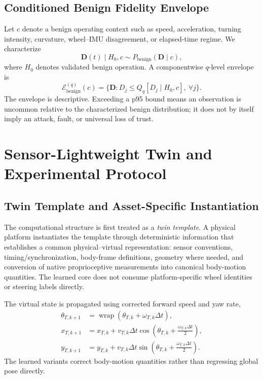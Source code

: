 \documentclass[journal]{IEEEtran}
\begin{document}
\subsection{Conditioned Benign Fidelity Envelope}
Let $c$ denote a benign operating context such as speed, acceleration, turning intensity, curvature, wheel--IMU disagreement, or elapsed-time regime. We characterize
\begin{equation}
\mathbf{D}(t)\mid H_0,c\sim P_{\mathrm{benign}}(\mathbf{D}\mid c),
\end{equation}
where $H_0$ denotes validated benign operation. A componentwise $q$-level envelope is
\begin{equation}
\mathcal{E}^{(q)}_{\mathrm{benign}}(c)=\{\mathbf{D}:D_j\le Q_q[D_j\mid H_0,c],\ \forall j\}.
\end{equation}
The envelope is descriptive. Exceeding a p95 bound means an observation is uncommon relative to the characterized benign distribution; it does not by itself imply an attack, fault, or universal loss of trust.

\section{Sensor-Lightweight Twin and Experimental Protocol}
\subsection{Twin Template and Asset-Specific Instantiation}
The computational structure is first treated as a \emph{twin template}. A physical platform instantiates the template through deterministic information that establishes a common physical--virtual representation: sensor conventions, timing/synchronization, body-frame definitions, geometry where needed, and conversion of native proprioceptive measurements into canonical body-motion quantities. The learned core does not consume platform-specific wheel identities or steering labels directly.

The virtual state is propagated using corrected forward speed and yaw rate,
\begin{align}
\theta_{T,k+1}&=\operatorname{wrap}(\theta_{T,k}+\omega_{T,k}\Delta t),\\
x_{T,k+1}&=x_{T,k}+v_{T,k}\Delta t\cos\!\left(\theta_{T,k}+\frac{\omega_{T,k}\Delta t}{2}\right),\\
y_{T,k+1}&=y_{T,k}+v_{T,k}\Delta t\sin\!\left(\theta_{T,k}+\frac{\omega_{T,k}\Delta t}{2}\right).
\end{align}
The learned variants correct body-motion quantities rather than regressing global pose directly.
\end{document}
